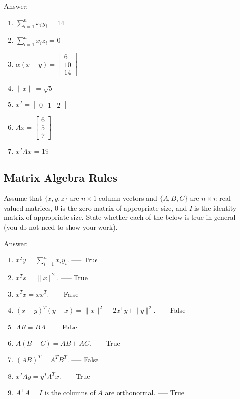 \documentclass{article}
\def\ans#1{\par\gre{Answer: #1}}
\def\blu#1{{\color{blu}#1}}
\def\gre#1{{\color{gre}#1}}
\def\norm#1{\|#1\|}
\def\enum#1{\begin{enumerate}#1\end{enumerate}}
\begin{document}
\ans{
    \enum{
    \item $\sum_{i=1}^n x_iy_i$ = 14
    \item $\sum_{i=1}^n x_iz_i$ = 0
    \item $\alpha(x+y) = \left[\begin{array}{ccc} 6 \\ 10 \\ 14 \end{array}\right]$
    \item $\norm{x} = \sqrt{5}$
    \item $x^T = \left[\begin{array}{ccc} 0 & 1 & 2 \end{array}\right]$
    \item $Ax = \left[\begin{array}{ccc} 6 \\ 5 \\ 7 \end{array}\right]$
    \item $x^TAx$ = 19
    }
}


\subsection{Matrix Algebra Rules}

Assume that $\{x,y,z\}$ are $n \times 1$ column vectors and $\{A,B,C\}$ are $n \times n$ real-valued matrices, $0$ is the zero matrix of appropriate size, and $I$ is the identity matrix of appropriate size. \blu{State whether each of the below is true in general} (you do not need to show your work).

\ans{
	\begin{enumerate}
		\item $x^Ty = \sum_{i=1}^n x_iy_i$. ----- True
		\item $x^Tx = \norm{x}^2$. ----- True
		\item $x^Tx = xx^T$. ----- False
		\item $(x-y)^T(y-x) = \norm{x}^2 - 2x^\top y + \norm{y}^2$. ----- False
		\item $AB=BA$. ----- False
		\item $A(B + C) = AB + AC$. ----- True
		\item $(AB)^T = A^TB^T$. ----- False
		\item $x^TAy = y^TA^Tx$. ----- True
		\item $A^\top A = I$ is the columns of $A$ are orthonormal. ----- True
	\end{enumerate}
}
\end{document}
